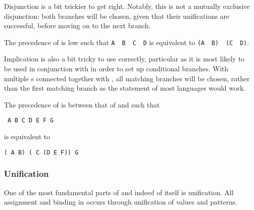 Disjunction is a bit trickier to get right. Notably, this is not a mutually
exclusive disjunction: both branches will be chosen, given that their unifications
are successful, before moving on to the next branch.

The precedence of  is low such that \texttt{A~~B~~C~~D}
is equivalent to \texttt{(A~~B)~~(C~~D)}.

\begin{prooftree}
\end{prooftree}

\begin{prooftree}
\end{prooftree}

Implication is also a bit tricky to use correctly, particular as it is most likely
to be used in conjunction with  in order to set up conditional branches.
With multiple s connected together with , all matching branches
will be chosen, rather than the first matching branch as the  statement
of most languages would work.

The precedence of  is between that of  and  such that

\begin{center}
\texttt{ A  B   C  D   E  F  G}
\end{center}

is equivalent to

\begin{center}
\texttt{( A  B)  ( C  (D   E  F))  G}
\end{center}

\subsubsection{Unification}

One of the most fundamental parts of \Law{} and indeed of \Trilogy{} itself
is unification. All assignment and binding in \Trilogy{} occurs through
unification of values and patterns.

